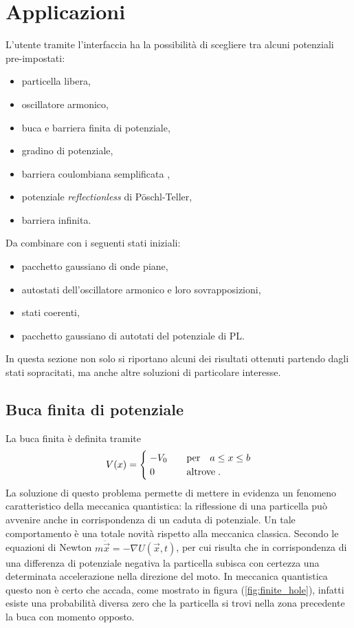 \chapter{Applicazioni}
\label{ch:applicazioni}

L'utente tramite l'interfaccia ha la possibilità di scegliere tra alcuni potenziali pre-impostati:
\begin{itemize}[nolistsep]
    \item particella libera,
    \item oscillatore armonico,
    \item buca e barriera finita di potenziale,
    \item gradino di potenziale,
    \item barriera coulombiana semplificata ,
    \item potenziale \textsl{reflectionless} di P\"oschl-Teller,
    \item barriera infinita.
\end{itemize}
Da combinare con i seguenti stati iniziali:
\begin{itemize}[nolistsep]
    \item pacchetto gaussiano di onde piane, 
    \item autostati dell'oscillatore armonico e loro sovrapposizioni,
    \item stati coerenti,
    \item pacchetto gaussiano di autotati del potenziale di PL.
\end{itemize}
In questa sezione non solo si riportano alcuni dei risultati ottenuti partendo dagli stati sopracitati, ma anche altre soluzioni di particolare interesse.


\section{Buca finita di potenziale}
\label{sec:finite_hole}

La buca finita è definita tramite
\begin{equation}
    \centering
    V(x) =
    \begin{cases}
        \; -V_0  \quad &\text{per} \quad a \le x \le b \\
        \; 0 \qquad &\text{altrove}      \; \text{.}
    \end{cases}
\end{equation}
La soluzione di questo problema permette di mettere in evidenza un fenomeno caratteristico della meccanica quantistica: la riflessione di una particella può avvenire anche in corrispondenza di un caduta di potenziale. 
Un tale comportamento è una totale novità rispetto alla meccanica classica. Secondo le equazioni di Newton $m \ddot{\vec{x}} = -\nabla U(\vec{x}, t)$, per cui risulta che in corrispondenza di una differenza di potenziale negativa la particella subisca con certezza una determinata accelerazione nella direzione del moto. In meccanica quantistica questo non è certo che accada, come mostrato in figura (\ref{fig:finite_hole}), infatti esiste una probabilità diversa zero che la particella si trovi nella zona precedente la buca con momento opposto.

